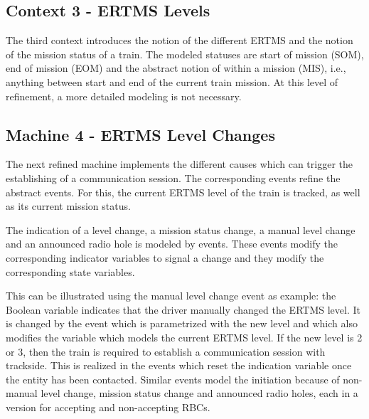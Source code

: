 \documentclass{template/openetcs_article}
\begin{document}
%

\subsection{Context 3 - ERTMS Levels}
\label{sec:context-3-ertms}

The third context introduces the notion of the different ERTMS and the notion of
the mission status of a train. The modeled statuses are start of mission (SOM),
end of mission (EOM) and the abstract notion of within a mission (MIS), i.e.,
anything between start and end of the current train mission. At this level of
refinement, a more detailed modeling is not necessary.

%


\subsection{Machine 4 - ERTMS Level Changes}
\label{sec:machine-4-ertms}

The next refined machine implements the different causes which can trigger the
establishing of a communication session. The corresponding events refine the
abstract  events. For this, the current
ERTMS level of the train is tracked, as well as its current mission status.

The indication of a level change, a mission status change, a manual level change
and an announced radio hole is modeled by events. These events modify the
corresponding indicator variables to signal a change and they modify the
corresponding state variables.

This can be illustrated using the manual level change event as example: the
Boolean variable  indicates that the driver
manually changed the ERTMS level. It is changed by the
 event which is parametrized with the new level and
which also modifies the  variable which models the current
ERTMS level. If the new level is 2 or 3, then the train is required to establish
a communication session with trackside. This is realized in the
 events which reset the
indication variable once the entity has been contacted.  Similar events model
the initiation because of non-manual level change, mission status change and
announced radio holes, each in a version for accepting and non-accepting RBCs.
\end{document}
